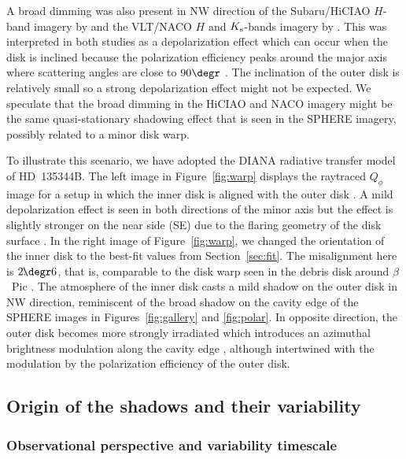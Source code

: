 \documentclass[twocolumn,tighten]{aastex61}
\newcommand{\ffdeg}{\mbox{\ensuremath{.\!\!\degr}}}
\begin{document}
A broad dimming was also present in NW direction of the Subaru/HiCIAO $H$-band imagery by \citet{muto2012} and the VLT/NACO $H$ and $K_{\rm s}$-bands imagery by \citet{garufi2013}. This was interpreted in both studies as a depolarization effect which can occur when the disk is inclined because the polarization efficiency peaks around the major axis where scattering angles are close to $90\degr$ \citep[e.g.,][]{murakawa2010,min2012}. The inclination of the outer disk is relatively small so a strong depolarization effect might not be expected. We speculate that the broad dimming in the HiCIAO and NACO imagery might be the same quasi-stationary shadowing effect that is seen in the SPHERE imagery, possibly related to a minor disk warp.

To illustrate this scenario, we have adopted the \mbox{DIANA} \citep[Disc Analysis;][]{woitke2016} radiative transfer model of HD~135344B. The left image in Figure~\ref{fig:warp} displays the raytraced $Q_\phi$ image for a setup in which the inner disk is aligned with the outer disk \citep[$i=20\degr$, ${\rm PA}=63\degr$;][]{vandermarel2015}. A mild depolarization effect is seen in both directions of the minor axis but the effect is slightly stronger on the near side (SE) due to the flaring geometry of the disk surface \citep{min2012}. In the right image of Figure~\ref{fig:warp}, we changed the orientation of the inner disk to the best-fit values from Section~\ref{sec:fit}. The misalignment here is $2\ffdeg6$, that is, comparable to the disk warp seen in the debris disk around $\beta$~Pic \citep[$\Delta\theta=4\ffdeg6$;][]{heap2000}. The atmosphere of the inner disk casts a mild shadow on the outer disk in NW direction, reminiscent of the broad shadow on the cavity edge of the SPHERE images in Figures~\ref{fig:gallery} and \ref{fig:polar}. In opposite direction, the outer disk becomes more strongly irradiated which introduces an azimuthal brightness modulation along the cavity edge \citep[see also][]{rosenfeld2012}, although intertwined with the modulation by the polarization efficiency of the outer disk.

\subsection{Origin of the shadows and their variability}\label{sec:origin}

\subsubsection{Observational perspective and variability timescale}\label{sec:observational_timescales}
\end{document}
